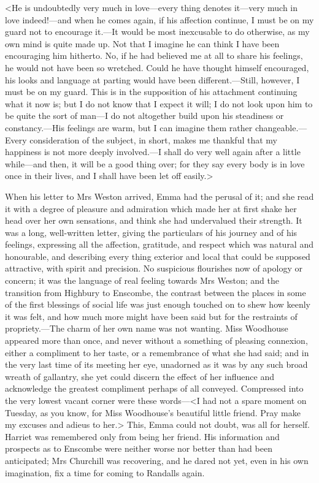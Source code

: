 <He is undoubtedly very much in love—every thing denotes it—very much in love indeed!—and when he comes again, if his affection continue, I must be on my guard not to encourage it.—It would be most inexcusable to do otherwise, as my own mind is quite made up. Not that I imagine he can think I have been encouraging him hitherto. No, if he had believed me at all to share his feelings, he would not have been so wretched. Could he have thought himself encouraged, his looks and language at parting would have been different.—Still, however, I must be on my guard. This is in the supposition of his attachment continuing what it now is; but I do not know that I expect it will; I do not look upon him to be quite the sort of man—I do not altogether build upon his steadiness or constancy.—His feelings are warm, but I can imagine them rather changeable.—Every consideration of the subject, in short, makes me thankful that my happiness is not more deeply involved.—I shall do very well again after a little while—and then, it will be a good thing over; for they say every body is in love once in their lives, and I shall have been let off easily.>

When his letter to Mrs Weston arrived, Emma had the perusal of it; and she read it with a degree of pleasure and admiration which made her at first shake her head over her own sensations, and think she had undervalued their strength. It was a long, well-written letter, giving the particulars of his journey and of his feelings, expressing all the affection, gratitude, and respect which was natural and honourable, and describing every thing exterior and local that could be supposed attractive, with spirit and precision. No suspicious flourishes now of apology or concern; it was the language of real feeling towards Mrs Weston; and the transition from Highbury to Enscombe, the contrast between the places in some of the first blessings of social life was just enough touched on to shew how keenly it was felt, and how much more might have been said but for the restraints of propriety.—The charm of her own name was not wanting. Miss Woodhouse appeared more than once, and never without a something of pleasing connexion, either a compliment to her taste, or a remembrance of what she had said; and in the very last time of its meeting her eye, unadorned as it was by any such broad wreath of gallantry, she yet could discern the effect of her influence and acknowledge the greatest compliment perhaps of all conveyed. Compressed into the very lowest vacant corner were these words—<I had not a spare moment on Tuesday, as you know, for Miss Woodhouse's beautiful little friend. Pray make my excuses and adieus to her.> This, Emma could not doubt, was all for herself. Harriet was remembered only from being her friend. His information and prospects as to Enscombe were neither worse nor better than had been anticipated; Mrs Churchill was recovering, and he dared not yet, even in his own imagination, fix a time for coming to Randalls again.

